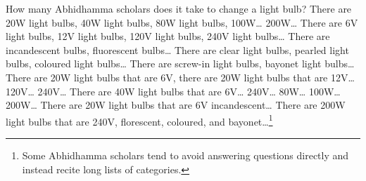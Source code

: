\color{black}


How many Abhidhamma scholars does it take to change a light bulb? There are 20W light bulbs, 40W light bulbs, 80W light bulbs, 100W… 200W… There are 6V light bulbs, 12V light bulbs, 120V light bulbs, 240V light bulbs… There are incandescent bulbs, fluorescent bulbs… There are clear light bulbs, pearled light bulbs, coloured light bulbs… There are screw-in light bulbs, bayonet light bulbs… There are 20W light bulbs that are 6V, there are 20W light bulbs that are 12V… 120V… 240V… There are 40W light bulbs that are 6V… 240V… 80W… 100W… 200W… There are 20W light bulbs that are 6V incandescent… There are 200W light bulbs that are 240V, florescent, coloured, and bayonet…\footnote{Some Abhidhamma scholars tend to avoid answering questions directly and instead recite long lists of categories.}
